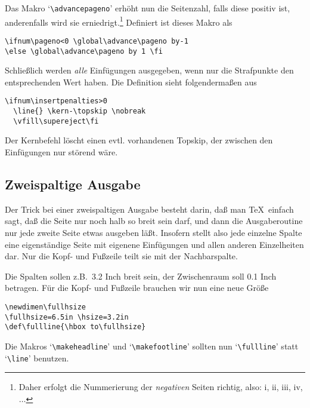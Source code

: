 Das Makro 
`\verb|\advancepageno|' erh\"oht nun die
Seitenzahl, falls
diese positiv ist, anderenfalls wird sie erniedrigt.\footnote{Daher
erfolgt die Nummerierung der {\em negativen} Seiten richtig, also: i,
ii, iii, iv, $\ldots$} Definiert ist dieses Makro als
\begin{verbatim}
\ifnum\pageno<0 \global\advance\pageno by-1
\else \global\advance\pageno by 1 \fi
\end{verbatim}

Schlie\ss{}lich werden {\em alle} 
Einf\"ugungen ausgegeben, wenn nur die
Strafpunkte den entsprechenden Wert haben. Die Definition sieht
folgenderma\ss{}en aus
\begin{verbatim}
\ifnum\insertpenalties>0
  \line{} \kern-\topskip \nobreak
  \vfill\supereject\fi
\end{verbatim}
Der Kernbefehl l\"oscht einen evtl. vorhandenen Topskip, der zwischen
den Einf\"ugungen nur st\"orend w\"are.
\subsection{Zweispaltige Ausgabe}
Der Trick bei einer zweispaltigen Ausgabe besteht darin, da\ss{} man \TeX\
einfach sagt, da\ss{} die Seite nur noch halb so breit sein darf, und dann
die Ausgaberoutine nur jede zweite Seite etwas ausgeben l\"a\ss{}t. Insofern
stellt also jede einzelne \index{Spalte!Seite}
Spalte eine eigenst\"andige Seite mit eigenene
Einf\"ugungen und allen anderen Einzelheiten dar. Nur die
Kopf- und
Fu\ss{}zeile teilt sie mit der
Nachbarspalte.

Die Spalten sollen z.B.\ 3.2 Inch breit sein, der 
Zwischenraum soll
0.1 Inch betragen. F\"ur die 
Kopf- und Fu\ss{}zeile brauchen wir nun eine
neue Gr\"o\ss{}e
\begin{verbatim}
\newdimen\fullhsize
\fullhsize=6.5in \hsize=3.2in
\def\fullline{\hbox to\fullhsize}
\end{verbatim}
Die Makros 
`\verb|\makeheadline|' und 
`\verb|\makefootline|' sollten
nun `\verb|\fullline|' statt 
`\verb|\line|' benutzen.

